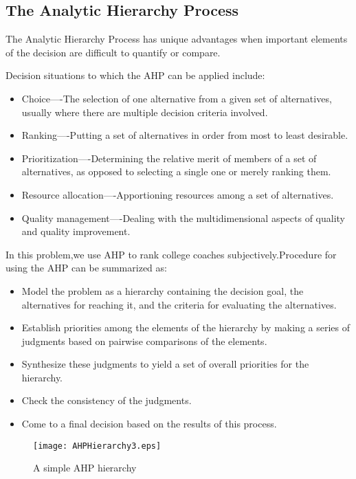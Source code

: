 \documentclass{mcmthesis}
\begin{document}
\subsection{The Analytic Hierarchy Process}

\par The Analytic Hierarchy Process has unique advantages when important elements of the decision are difficult to quantify or compare.
\par Decision situations to which the AHP can be applied include:
\begin{itemize}
\item Choice----The selection of one alternative from a given set of alternatives, usually where there are multiple decision criteria involved.
\item Ranking----Putting a set of alternatives in order from most to least desirable.
\item Prioritization----Determining the relative merit of members of a set of alternatives, as opposed to selecting a single one or merely ranking them.
\item Resource allocation----Apportioning resources among a set of alternatives.
\item Quality management----Dealing with the multidimensional aspects of quality and quality improvement.
\end{itemize}

\par In this problem,we use AHP to rank college coaches subjectively.Procedure for using the AHP can be summarized as:
\begin{itemize}
\item Model the problem as a hierarchy containing the decision goal, the alternatives for reaching it, and the criteria for evaluating the alternatives.
\item  Establish priorities among the elements of the hierarchy by making a series of judgments based on pairwise comparisons of the elements. 
\item Synthesize these judgments to yield a set of overall priorities for the hierarchy. 
\item Check the consistency of the judgments.
\item Come to a final decision based on the results of this process.
\end{itemize}

\begin{figure} [!ht]
\centering
\texttt{[image: AHPHierarchy3.eps]}
\caption{A simple AHP hierarchy}
\label{fig:graph}
\end{figure}
\end{document}
